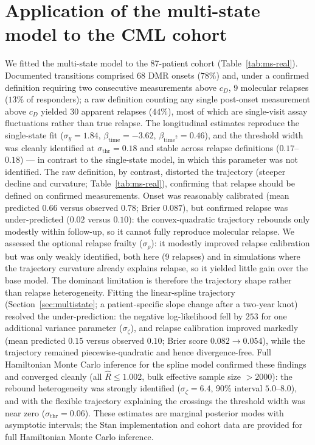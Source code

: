 \documentclass[11pt]{article}
\begin{document}
\section{Application of the multi-state model to the CML cohort}
\label{sec:ms-real}

We fitted the multi-state model to the 87-patient cohort
(Table~\ref{tab:ms-real}). Documented transitions comprised 68 DMR onsets
($78\%$) and, under a confirmed definition requiring two consecutive
measurements above $c_D$, 9 molecular relapses ($13\%$ of responders); a raw
definition counting any single post-onset measurement above $c_D$ yielded 30
apparent relapses ($44\%$), most of which are single-visit assay fluctuations
rather than true relapse. The longitudinal estimates reproduce the single-state
fit ($\sigma_y=1.84$, $\beta_{\mathrm{time}}=-3.62$,
$\beta_{\mathrm{time}^2}=0.46$), and the threshold width was cleanly identified
at $\sigma_{\mathrm{thr}}=0.18$ and stable across relapse definitions
($0.17$--$0.18$) --- in contrast to the single-state model, in which this
parameter was not identified. The raw definition, by contrast, distorted the
trajectory (steeper decline and curvature; Table~\ref{tab:ms-real}), confirming
that relapse should be defined on confirmed measurements. Onset was reasonably
calibrated (mean predicted $0.66$ versus observed $0.78$; Brier $0.087$), but
confirmed relapse was under-predicted ($0.02$ versus $0.10$): the
convex-quadratic trajectory rebounds only modestly within follow-up, so it
cannot fully reproduce molecular relapse. We assessed the optional relapse frailty ($\sigma_\rho$): it modestly improved
relapse calibration but was only weakly identified, both here (9 relapses) and
in simulations where the trajectory curvature already explains relapse, so it
yielded little gain over the base model. The dominant limitation is therefore
the trajectory shape rather than relapse heterogeneity. Fitting the
linear-spline trajectory (Section~\ref{sec:multistate}; a patient-specific slope
change after a two-year knot) resolved the under-prediction: the negative
log-likelihood fell by $253$ for one additional variance parameter
($\sigma_\zeta$), and relapse calibration improved markedly (mean predicted
$0.15$ versus observed $0.10$; Brier score $0.082\to0.054$), while the trajectory
remained piecewise-quadratic and hence divergence-free. Full Hamiltonian Monte
Carlo inference for the spline model confirmed these findings and converged
cleanly (all $\widehat R\le1.002$, bulk effective sample size $>2000$): the
rebound heterogeneity was strongly identified ($\sigma_\zeta=6.4$, 90\% interval
$5.0$--$8.0$), and with the flexible trajectory explaining the crossings the
threshold width was near zero ($\sigma_{\mathrm{thr}}=0.06$). These estimates are marginal posterior modes with asymptotic
intervals; the Stan implementation and cohort data are provided for full
Hamiltonian Monte Carlo inference.
\end{document}
